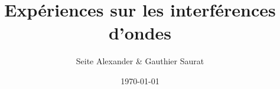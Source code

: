 \documentclass[letterpaper,12pt]{article}
\begin{document}
\title{Expériences sur les interférences d'ondes}

    \author{Seite Alexander & Gauthier Saurat}
\date{\today}
\maketitle
\newline

\tableofcontents

\newpage










%









%






\end{document}

